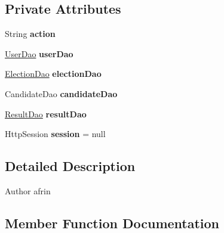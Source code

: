 \subsection*{Private Attributes}
\begin{DoxyCompactItemize}
\item 
\mbox{\label{class_controller_1_1_user_controller_a5ab048a6834792f94aa5d0b86e8117b7}} 
String {\bfseries action}
\item 
\mbox{\label{class_controller_1_1_user_controller_ad88c4864d3bce90d1d6f9eabd1b7e099}} 
\mbox{\hyperlink{class_d_a_o_1_1_user_dao}{User\+Dao}} {\bfseries user\+Dao}
\item 
\mbox{\label{class_controller_1_1_user_controller_a3eb37ea2bcc278d21a300f1fdb96e00f}} 
\mbox{\hyperlink{class_d_a_o_1_1_election_dao}{Election\+Dao}} {\bfseries election\+Dao}
\item 
\mbox{\label{class_controller_1_1_user_controller_ad03508156800d325cdaff7e1ad114577}} 
Candidate\+Dao {\bfseries candidate\+Dao}
\item 
\mbox{\label{class_controller_1_1_user_controller_aed112b512e82a74e31f477d2af5769b7}} 
\mbox{\hyperlink{class_d_a_o_1_1_result_dao}{Result\+Dao}} {\bfseries result\+Dao}
\item 
\mbox{\label{class_controller_1_1_user_controller_a0a46681b3cc352e181b69e7a53769290}} 
Http\+Session {\bfseries session} = null
\end{DoxyCompactItemize}


\subsection{Detailed Description}
\begin{DoxyAuthor}{Author}
afrin 
\end{DoxyAuthor}


\subsection{Member Function Documentation}
\mbox{\label{class_controller_1_1_user_controller_a8238459bce03a923af753206e22e3096}} 

